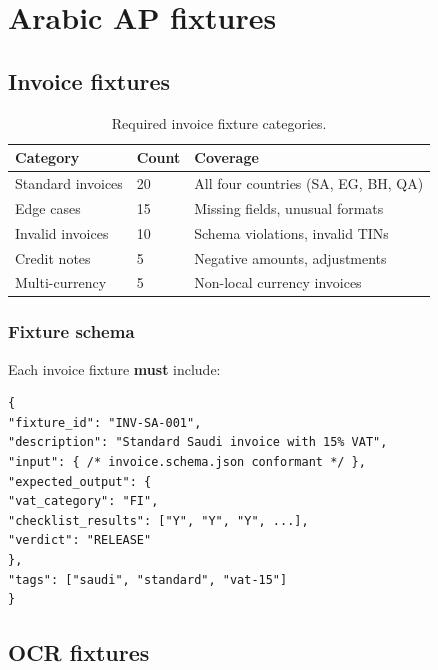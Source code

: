 \documentclass[12pt,a4paper,twoside]{report}
\begin{document}
\section{Arabic AP fixtures}

\subsection{Invoice fixtures}

\begin{table}[htbp]
\centering
\caption{Required invoice fixture categories.}
\label{tab:invoice-fixtures}
\footnotesize
\begin{tabularx}{\linewidth}{@{}l l X@{}}
\toprule
\textbf{Category} & \textbf{Count} & \textbf{Coverage} \\ \midrule
Standard invoices & 20 & All four countries (SA, EG, BH, QA) \\
Edge cases & 15 & Missing fields, unusual formats \\
Invalid invoices & 10 & Schema violations, invalid TINs \\
Credit notes & 5 & Negative amounts, adjustments \\
Multi-currency & 5 & Non-local currency invoices \\
\bottomrule
\end{tabularx}
\end{table}

\subsubsection{Fixture schema}

Each invoice fixture \textbf{must} include:
\begin{lstlisting}[basicstyle=\ttfamily\small]
{
"fixture_id": "INV-SA-001",
"description": "Standard Saudi invoice with 15% VAT",
"input": { /* invoice.schema.json conformant */ },
"expected_output": {
"vat_category": "FI",
"checklist_results": ["Y", "Y", "Y", ...],
"verdict": "RELEASE"
},
"tags": ["saudi", "standard", "vat-15"]
}
\end{lstlisting}

\subsection{OCR fixtures}
\end{document}
